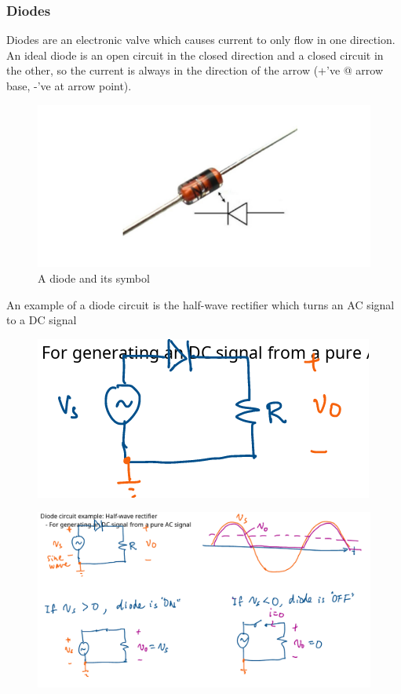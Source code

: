 \documentclass[10pt]{article}
\begin{document}
\subsubsection{Diodes}

Diodes are an electronic valve which causes current to only flow in one direction.
An ideal diode is an open circuit in the closed direction and a closed circuit in the other, so the current is always in the direction of the arrow (+'ve @ arrow base, -'ve at arrow point).


\begin{figure}[H]
	\centering
	\includegraphics[width=0.8\linewidth]{img/360_diode.png}
	\caption{A diode and its symbol}
	\label{fig:360:diode}
\end{figure}


An example of a diode circuit is the half-wave rectifier which turns an AC signal to a DC signal 

\begin{figure}[H]
	\centering
	\includegraphics[width=0.8\linewidth]{img/image_2022-09-09-12-51-30.png}
\end{figure}

\begin{figure}[H]
	\centering
	\includegraphics[width=0.8\linewidth]{img/image_2022-09-09-13-01-02.png}
\end{figure}
\end{document}
